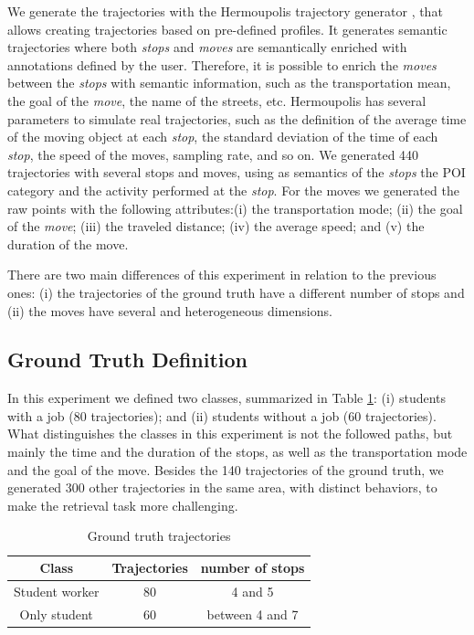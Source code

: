 We generate the trajectories with the  Hermoupolis trajectory generator \cite{Pelekis-Hermoupolis}, that allows creating trajectories based on pre-defined profiles. It generates semantic trajectories where both \emph{stops} and \emph{moves} are semantically enriched with annotations defined by the user. Therefore, it is possible to enrich the \emph{moves} between the \emph{stops} with semantic information, such as the transportation mean, the goal of the \emph{move}, the name of the streets, etc. Hermoupolis has several parameters to simulate real trajectories, such as the definition of the average time of the moving object at each \emph{stop}, the standard deviation of the time of each \emph{stop}, the speed of the moves, sampling rate, and so on. We generated 440 trajectories with several stops and moves, using as semantics of the \emph{stops} the POI category and the activity performed at the \emph{stop}. For the moves we generated the raw points with the following attributes:(i) the transportation mode; (ii) the goal of the \emph{move}; (iii) the traveled distance; (iv) the average speed; and (v) the duration of the move.

There are two main differences of this experiment in relation to the previous ones: (i) the trajectories of the ground truth have a different number of stops and (ii) the moves have several and heterogeneous dimensions.

\subsection{Ground Truth Definition}
{In this experiment we defined two classes, summarized in Table {\ref{tab:hermoupolis_dataset}}: (i) students with a job (80 trajectories); and (ii) students without a job (60 trajectories). What distinguishes the classes in this experiment is not the followed paths, but mainly the time and the duration of the stops, as well as the transportation mode and the goal of the move. Besides the 140 trajectories of the ground truth, we generated 300 other trajectories in the same area, with distinct behaviors, to make the retrieval task more challenging.}

\begin{table}[ht!]
\scriptsize
  \centering
  \begin{tabular}{|c|c|c|}
  \hline
  Class & Trajectories & number of stops \\
  \hline
Student worker & 80 & 4 and 5 \\
Only student & 60 & between 4 and 7 \\
    \hline
  \end{tabular}
  \caption{Ground truth trajectories}
  \label{tab:hermoupolis_dataset}
\end{table}

